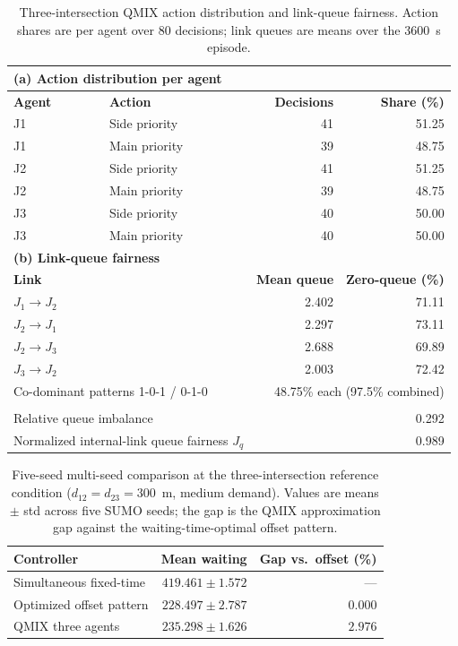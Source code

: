 \documentclass[12pt]{article}
\begin{document}
\begin{table}[H]
\centering
\caption{Three-intersection QMIX action distribution and link-queue fairness. Action
shares are per agent over 80 decisions; link queues are means over the 3600~s episode.}
\label{tab:supp_policy}
\small
\setlength{\tabcolsep}{6pt}
\begin{tabular}{llrr}
\toprule
\multicolumn{4}{l}{\textbf{(a) Action distribution per agent}} \\
\midrule
\textbf{Agent} & \textbf{Action} & \textbf{Decisions} & \textbf{Share (\%)} \\
\midrule
J1 & Side priority & 41 & 51.25 \\
J1 & Main priority & 39 & 48.75 \\
J2 & Side priority & 41 & 51.25 \\
J2 & Main priority & 39 & 48.75 \\
J3 & Side priority & 40 & 50.00 \\
J3 & Main priority & 40 & 50.00 \\
\midrule
\multicolumn{4}{l}{\textbf{(b) Link-queue fairness}} \\
\midrule
\textbf{Link} & & \textbf{Mean queue} & \textbf{Zero-queue (\%)} \\
\midrule
$J_1\!\to\!J_2$ & & 2.402 & 71.11 \\
$J_2\!\to\!J_1$ & & 2.297 & 73.11 \\
$J_2\!\to\!J_3$ & & 2.688 & 69.89 \\
$J_3\!\to\!J_2$ & & 2.003 & 72.42 \\
\midrule
\multicolumn{2}{l}{Co-dominant patterns 1-0-1 / 0-1-0} & \multicolumn{2}{r}{48.75\% each (97.5\% combined)} \\ \\
\multicolumn{2}{l}{Relative queue imbalance} & \multicolumn{2}{r}{0.292} \\
\multicolumn{2}{l}{Normalized internal-link queue fairness $J_q$} & \multicolumn{2}{r}{0.989} \\
\bottomrule
\end{tabular}
\end{table}

\begin{table}[H]
\centering
\caption{Five-seed multi-seed comparison at the three-intersection reference
condition ($d_{12}=d_{23}=300$~m, medium demand). Values are means $\pm$ std
across five SUMO seeds; the gap is the QMIX approximation gap against the
waiting-time-optimal offset pattern.}
\label{tab:multiseed_three_int}
\small
\begin{tabular}{lrr}
\toprule
\textbf{Controller} & \textbf{Mean waiting} & \textbf{Gap vs.\ offset (\%)} \\
\midrule
Simultaneous fixed-time  & $419.461 \pm 1.572$ & --- \\
Optimized offset pattern & $228.497 \pm 2.787$ & $0.000$ \\
QMIX three agents        & $235.298 \pm 1.626$ & $2.976$ \\
\bottomrule
\end{tabular}
\end{table}
\end{document}

